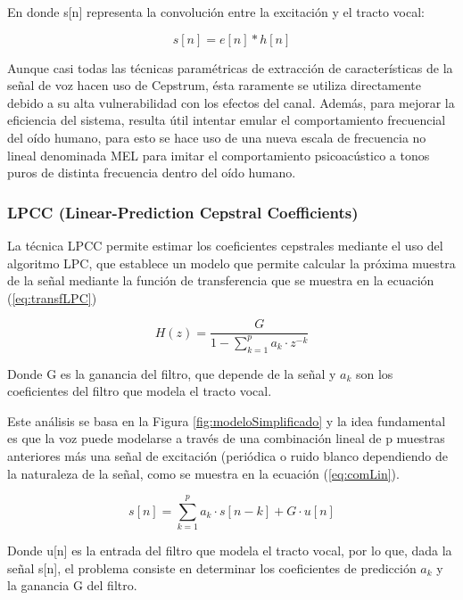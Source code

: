 En donde s[n] representa la convolución entre la excitación y el tracto vocal:

\begin{equation}\label{eq:conv}
	s[n]=e[n]*h[n]
\end{equation}

Aunque casi todas las técnicas paramétricas de extracción de características de la señal de voz hacen uso de Cepstrum, ésta raramente se utiliza directamente debido a su alta vulnerabilidad con los efectos del canal. Además, para mejorar la eficiencia del sistema, resulta útil intentar emular el comportamiento frecuencial del oído humano, para esto se hace uso de una nueva escala de frecuencia no lineal denominada MEL para imitar el comportamiento psicoacústico a tonos puros de distinta frecuencia dentro del oído humano. \cite{David2012}

\subsubsection{LPCC (Linear-Prediction Cepstral Coefficients)}

La técnica LPCC permite estimar los coeficientes cepstrales mediante el uso del algoritmo LPC, que establece un modelo que permite calcular la próxima muestra de la señal mediante la función de transferencia que se muestra en la ecuación (\ref{eq:transfLPC})

\begin{equation}\label{eq:transfLPC}
	H(z)=\frac{G}{1-\sum_{k=1}^{p}{a_k\cdot z^{-k}}}
\end{equation}

Donde G es la ganancia del filtro, que depende de la señal y $a_k$ son los coeficientes del filtro que modela el tracto vocal.

Este análisis se basa en la Figura \ref{fig:modeloSimplificado} y la idea fundamental es que la voz puede modelarse a través de una combinación lineal de p muestras anteriores más una señal de excitación (periódica o ruido blanco dependiendo de la naturaleza de la señal, como se muestra en la ecuación (\ref{eq:comLin}).

\begin{equation}\label{eq:comLin}
	s[n]=\sum_{k=1}^{p}{a_k\cdot s[n-k]+G\cdot u[n]}
\end{equation}

Donde u[n] es la entrada del filtro que modela el tracto vocal, por lo que, dada la señal s[n], el problema consiste en determinar los coeficientes de predicción $a_k$ y la ganancia G del filtro.

